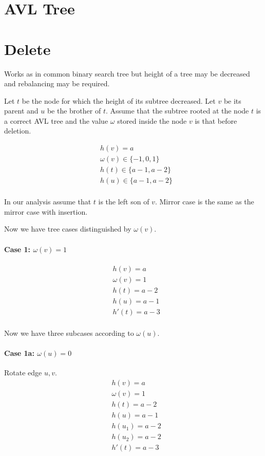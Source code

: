 \section*{AVL Tree}

\section*{Delete}

Works as in common binary search tree but height of a tree may be decreased and rebalancing may be required. 

Let $t$ be the node for which the height of its subtree decreased. Let $v$ be its parent and $u$ be the brother of $t$. Assume that the subtree rooted at the node $t$ is a correct AVL tree and the value $\omega$ stored inside the node $v$ is that before deletion.

\[
\begin{split}
& h(v) = a \\
& \omega(v) \in \{-1, 0, 1\} \\
& h(t) \in \{a - 1, a - 2\} \\
& h(u) \in \{a - 1, a - 2\} \\
\end{split}
\]

\vspace{1cm}

In our analysis assume that $t$ is the left son of $v$. Mirror case is the same as the mirror case with insertion.

Now we have tree cases distinguished by $\omega(v)$.

\pagebreak

\paragraph*{\textbf{Case 1}: $\omega(v) = 1$}
\[
\begin{split}
& h(v) = a \\
& \omega(v) = 1 \\
& h(t) = a - 2 \\
& h(u) = a - 1 \\
& h'(t) = a - 3 \\
\end{split}
\]

Now we have three subcases according to $\omega(u)$.
\paragraph*{\textbf{Case 1a}: $\omega(u) = 0$}
Rotate edge $u, v$.
\[
\begin{split}
& h(v) = a \\
& \omega(v) = 1 \\
& h(t) = a - 2 \\
& h(u) = a - 1 \\
& h(u_1) = a - 2 \\
& h(u_2) = a - 2 \\
& h'(t) = a - 3 \\
\end{split}
\]

